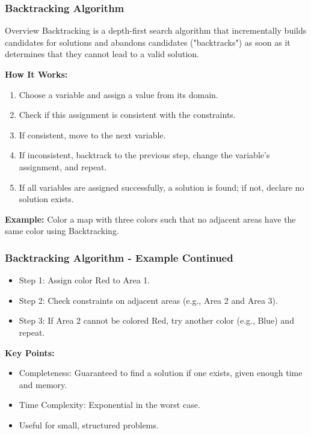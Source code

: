 \documentclass[aspectratio=169]{beamer}
\begin{document}
\begin{frame}[fragile]
    \frametitle{Backtracking Algorithm}
    
    \begin{block}{Overview}
        Backtracking is a depth-first search algorithm that incrementally builds candidates for solutions and abandons candidates ("backtracks") as soon as it determines that they cannot lead to a valid solution.
    \end{block}
    
    \textbf{How It Works:}
    \begin{enumerate}
        \item Choose a variable and assign a value from its domain.
        \item Check if this assignment is consistent with the constraints.
        \item If consistent, move to the next variable.
        \item If inconsistent, backtrack to the previous step, change the variable’s assignment, and repeat.
        \item If all variables are assigned successfully, a solution is found; if not, declare no solution exists.
    \end{enumerate}

    \textbf{Example:}
    Color a map with three colors such that no adjacent areas have the same color using Backtracking.
\end{frame}

\begin{frame}
    \frametitle{Backtracking Algorithm - Example Continued}
    
    \begin{itemize}
        \item Step 1: Assign color Red to Area 1.
        \item Step 2: Check constraints on adjacent areas (e.g., Area 2 and Area 3).
        \item Step 3: If Area 2 cannot be colored Red, try another color (e.g., Blue) and repeat.
    \end{itemize}
    
    \textbf{Key Points:}
    \begin{itemize}
        \item Completeness: Guaranteed to find a solution if one exists, given enough time and memory.
        \item Time Complexity: Exponential in the worst case.
        \item Useful for small, structured problems.
    \end{itemize}
\end{frame}
\end{document}
